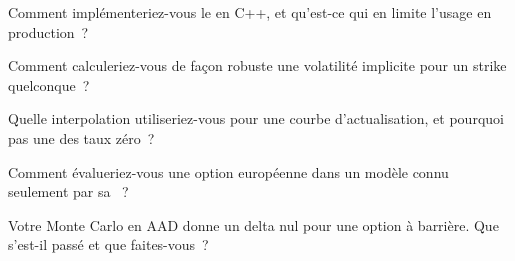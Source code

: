 \begin{interviewq}\label{iq:qm:transforms-interpolation-and-algorithmic-differentiation:2}
Comment implémenteriez-vous le  en C++, et qu'est-ce qui en limite l'usage en production~?
\end{interviewq}

\begin{interviewq}\label{iq:qm:transforms-interpolation-and-algorithmic-differentiation:3}
Comment calculeriez-vous de façon robuste une volatilité implicite pour un strike quelconque~?
\end{interviewq}

\begin{interviewq}\label{iq:qm:transforms-interpolation-and-algorithmic-differentiation:4}
Quelle interpolation utiliseriez-vous pour une courbe d'actualisation, et pourquoi pas une  des taux zéro~?
\end{interviewq}

\begin{interviewq}\label{iq:qm:transforms-interpolation-and-algorithmic-differentiation:5}
Comment évalueriez-vous une option européenne dans un modèle connu seulement par sa ~?
\end{interviewq}

\begin{interviewq}\label{iq:qm:transforms-interpolation-and-algorithmic-differentiation:6}
Votre Monte Carlo en AAD donne un delta nul pour une option à barrière. Que s'est-il passé et que faites-vous~?
\end{interviewq}

